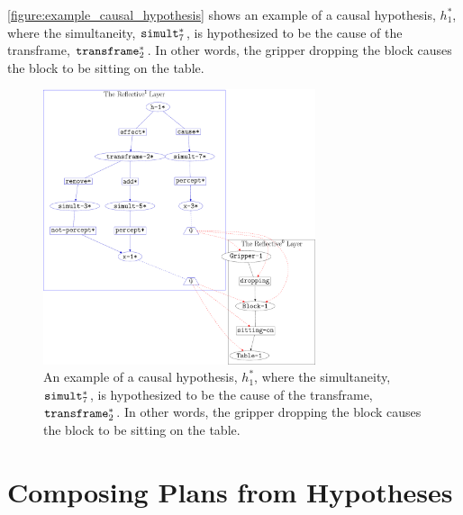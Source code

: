 {\mbox{\autoref{figure:example_causal_hypothesis}}} shows an example
of a causal hypothesis, $h_1^*$, where the simultaneity,
$\text{\tt{simult}}_7^*$, is hypothesized to be the cause of the
transframe, $\text{\tt{transframe}}_2^*$.  In other words, the gripper
dropping the block causes the block to be sitting on the table.
\begin{figure}
\center
\includegraphics[width=8cm]{gfx/example_causal_hypothesis}
\caption[An example of a causal hypothesis.]{An example of a causal
  hypothesis, $h_1^*$, where the simultaneity,
  $\text{\tt{simult}}_7^*$, is hypothesized to be the cause of the
  transframe, $\text{\tt{transframe}}_2^*$.  In other words, the
  gripper dropping the block causes the block to be sitting on the
  table.}
\label{figure:example_causal_hypothesis}
\end{figure}

\section{Composing Plans from Hypotheses}

